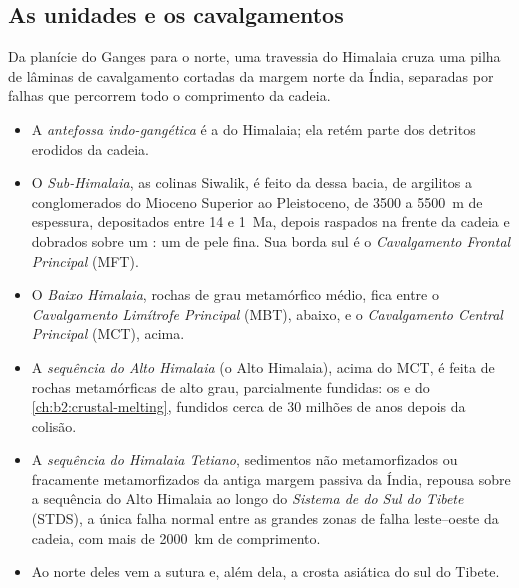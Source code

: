 \subsection{As unidades e os cavalgamentos}

Da planície do Ganges para o norte, uma travessia do Himalaia cruza uma pilha de lâminas de cavalgamento
cortadas da margem norte da Índia, separadas por falhas que percorrem todo o comprimento da cadeia.
\begin{itemize}
\item A \emph{antefossa indo-gangética} é a  do Himalaia; ela retém parte
dos detritos erodidos da cadeia.
\item O \emph{Sub-Himalaia}, as colinas Siwalik, é feito da  dessa bacia,
de argilitos a conglomerados do Mioceno Superior ao Pleistoceno, de 3500 a \qty{5500}{m} de espessura,
depositados entre 14 e \qty{1}{Ma}, depois raspados na frente da cadeia e dobrados sobre um
: um  de pele fina. Sua borda sul é o \emph{Cavalgamento Frontal
Principal} (MFT).
\item O \emph{Baixo Himalaia}, rochas de grau metamórfico médio, fica entre o
\emph{Cavalgamento Limítrofe Principal} (MBT), abaixo, e o \emph{Cavalgamento Central Principal} (MCT), acima.
\item A \emph{sequência do Alto Himalaia} (o Alto Himalaia), acima do MCT, é feita de
rochas metamórficas de alto grau, parcialmente fundidas: os  e  do
\cref{ch:b2:crustal-melting}, fundidos cerca de 30 milhões de anos depois da colisão.
\item A \emph{sequência do Himalaia Tetiano}, sedimentos não metamorfizados ou fracamente metamorfizados
da antiga margem passiva da Índia, repousa sobre a sequência do Alto Himalaia ao longo do
\emph{Sistema de  do Sul do Tibete} (STDS), a única falha normal entre as grandes
zonas de falha leste--oeste da cadeia, com mais de \qty{2000}{km} de comprimento.
\item Ao norte deles vem a sutura e, além dela, a crosta asiática do sul do Tibete.
\end{itemize}

